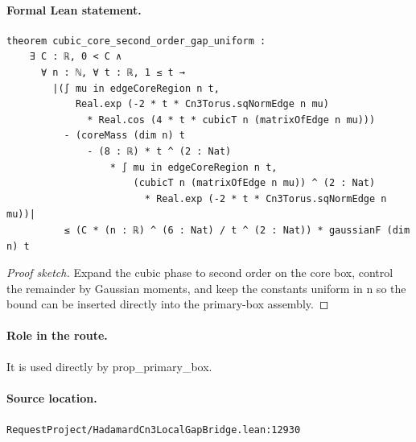 \medskip
\paragraph{Formal Lean statement.}
\begin{verbatim}
theorem cubic_core_second_order_gap_uniform :
    ∃ C : ℝ, 0 < C ∧
      ∀ n : ℕ, ∀ t : ℝ, 1 ≤ t →
        |(∫ mu in edgeCoreRegion n t,
            Real.exp (-2 * t * Cn3Torus.sqNormEdge n mu)
              * Real.cos (4 * t * cubicT n (matrixOfEdge n mu)))
          - (coreMass (dim n) t
              - (8 : ℝ) * t ^ (2 : Nat)
                  * ∫ mu in edgeCoreRegion n t,
                      (cubicT n (matrixOfEdge n mu)) ^ (2 : Nat)
                        * Real.exp (-2 * t * Cn3Torus.sqNormEdge n mu))|
          ≤ (C * (n : ℝ) ^ (6 : Nat) / t ^ (2 : Nat)) * gaussianF (dim n) t
\end{verbatim}
\begin{proof}[Proof sketch]
Expand the cubic phase to second order on the core box, control the remainder by Gaussian moments, and keep the constants uniform in n so the bound can be inserted directly into the primary-box assembly.
\end{proof}
\paragraph{Role in the route.}
It is used directly by prop\_primary\_box.
\paragraph{Source location.}
\texttt{RequestProject/HadamardCn3LocalGapBridge.lean:12930}
\medskip
